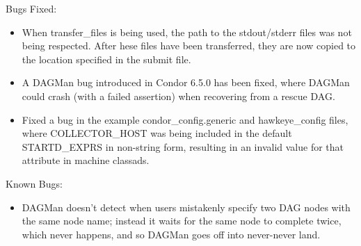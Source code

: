 \noindent Bugs Fixed:
\begin{itemize}

\item When transfer\_files is being used, the path to the stdout/stderr
files was not being respected.  After hese files have been transferred,
they are now copied to the location specified in the submit file.

\item A DAGMan bug introduced in Condor 6.5.0 has been fixed, where
DAGMan could crash (with a failed assertion) when recovering from a
rescue DAG.

\item Fixed a bug in the example condor\_config.generic and
hawkeye\_config files, where COLLECTOR\_HOST was being included in the
default STARTD\_EXPRS in non-string form, resulting in an invalid value
for that attribute in machine classads.

\end{itemize}

\noindent Known Bugs:
\begin{itemize}

\item DAGMan doesn't detect when users mistakenly specify two
DAG nodes with the same node name; instead it waits for the
same node to complete twice, which never happens, and so DAGMan
goes off into never-never land.

\end{itemize}

